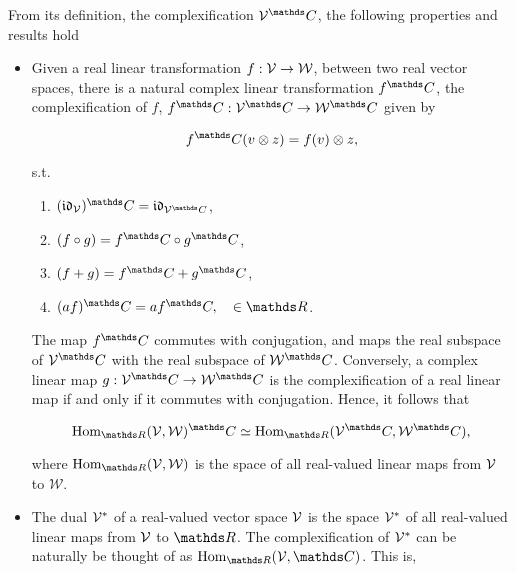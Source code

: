 \begin{remark}
    \textnormal{From its definition, the complexification $\vectorspace^\C$, the following properties and results hold}
    
    \begin{itemize}
        \item \textnormal{Given a real linear transformation $f: \mathcal{V} \rightarrow \mathcal{W}$, between two real vector spaces, there is a natural complex linear transformation $f^\C$, the complexification of $f$, $f^\C : \vectorspace^\C \rightarrow \mathcal{W}^\C$ given by}
        
        \begin{equation*}
            f^\C (v\otimes z) = f(v) \otimes z, 
        \end{equation*}
        
        \textnormal{ s.t. } 
        
        \begin{enumerate}
             \item $(\idop_\vectorspace)^\C = \idop_{\vectorspace^\C}$,
             \item $(f \circ g) = f^\C \circ g^\C$,
             \item $(f + g) = f^\C + g^\C$,
             \item $(af)^\C = a f^\C, \quad \in \R$.
        \end{enumerate} 
        
        \textnormal{
        The map $f^\C$ commutes with conjugation, and maps the real subspace of $\vectorspace^\C$ with the real subspace of $\mathcal{W}^\C$. Conversely, a complex linear map $g : \vectorspace^\C \rightarrow \mathcal{W}^\C$ is the complexification of a real linear map if and only if it commutes with conjugation. Hence, it follows that 
        }
        
        $$
            \textnormal{Hom}_{\R}(\vectorspace, \mathcal{W})^\C \simeq \textnormal{Hom}_{\R}(\vectorspace^\C, \mathcal{W}^\C),
        $$
        
        \textnormal{
        where $\textnormal{Hom}_{\R}(\vectorspace, \mathcal{W})$ is the space of all real-valued linear maps from $\mathcal{V}$ to $\mathcal{W}$.
        }
        
        \item \textnormal{
        The dual $\mathcal{V}^{*}$ of a real-valued vector space $\mathcal{V}$ is the space $\mathcal{V}^{*}$ of all real-valued linear maps from $\mathcal{V}$ to $\R$. 
        The complexification of $\mathcal{V}^{*}$ can be naturally be thought of as $\textnormal{Hom}_{\R}(\vectorspace, \C)$. This is,
        }
        

\end{itemize}
\end{remark}

